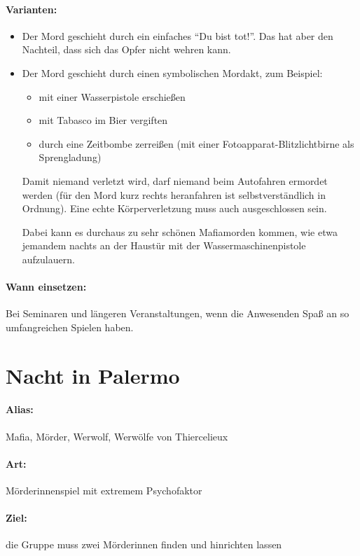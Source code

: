 \paragraph{Varianten:}\begin{itemize}
		\item Der Mord geschieht durch ein einfaches "`Du bist tot!"'. Das hat aber den Nachteil, dass sich das Opfer nicht wehren kann.
		\item Der Mord geschieht durch einen symbolischen Mordakt, zum Beispiel:
			\begin{itemize}
				\item mit einer Wasserpistole erschießen
				\item mit Tabasco im Bier vergiften
				\item durch eine Zeitbombe zerreißen (mit einer Fotoapparat-Blitz\-licht\-birne als Sprengladung)
			\end{itemize}
		Damit niemand verletzt wird, darf niemand beim Autofahren ermordet werden (für den Mord kurz rechts heranfahren ist selbstverständlich in Ordnung). Eine echte Körperverletzung muss auch ausgeschlossen sein.
		
		Dabei kann es durchaus zu sehr schönen Mafiamorden kommen, wie etwa jemandem nachts an der Haustür mit der Wassermaschinenpistole aufzulauern.
	\end{itemize}
\paragraph{Wann einsetzen:} Bei Seminaren und längeren Veranstaltungen, wenn die Anwesenden Spaß an so umfangreichen Spielen haben.


\section{Nacht in Palermo}
\paragraph{Alias:} Mafia, Mörder, Werwolf, Werwölfe von Thiercelieux
\paragraph{Art:} Mörderinnenspiel mit extremem Psychofaktor
\paragraph{Ziel:} die Gruppe muss zwei Mörderinnen finden und hinrichten lassen

